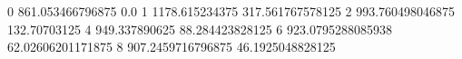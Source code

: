 0 861.053466796875 0.0
1 1178.615234375 317.561767578125
2 993.760498046875 132.70703125
4 949.337890625 88.284423828125
6 923.0795288085938 62.02606201171875
8 907.2459716796875 46.1925048828125
